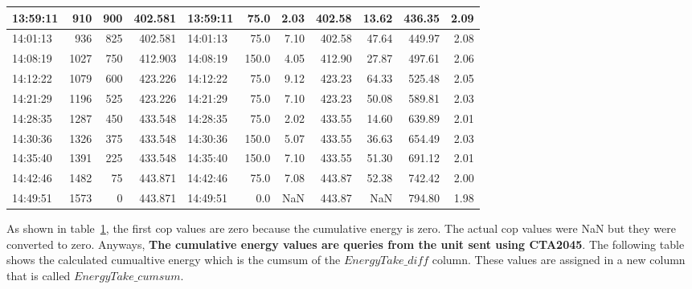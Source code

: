 \begin{table}[ht!]
\begin{adjustbox}{max width=\textwidth}
\begin{tabular}{|l|r|r|r|l|r|r|r|r|r|r|}
13:59:11 &                910 &                900 &         402.581 & 13:59:11 &             75.0 &       2.03 &         402.58 &  13.62 &     436.35 & 2.09 \\ \hline
14:01:13 &                936 &                825 &         402.581 & 14:01:13 &             75.0 &       7.10 &         402.58 &  47.64 &     449.97 & 2.08 \\ \hline
14:08:19 &               1027 &                750 &         412.903 & 14:08:19 &            150.0 &       4.05 &         412.90 &  27.87 &     497.61 & 2.06 \\ \hline
14:12:22 &               1079 &                600 &         423.226 & 14:12:22 &             75.0 &       9.12 &         423.23 &  64.33 &     525.48 & 2.05 \\ \hline
14:21:29 &               1196 &                525 &         423.226 & 14:21:29 &             75.0 &       7.10 &         423.23 &  50.08 &     589.81 & 2.03 \\ \hline
14:28:35 &               1287 &                450 &         433.548 & 14:28:35 &             75.0 &       2.02 &         433.55 &  14.60 &     639.89 & 2.01 \\ \hline
14:30:36 &               1326 &                375 &         433.548 & 14:30:36 &            150.0 &       5.07 &         433.55 &  36.63 &     654.49 & 2.03 \\ \hline
14:35:40 &               1391 &                225 &         433.548 & 14:35:40 &            150.0 &       7.10 &         433.55 &  51.30 &     691.12 & 2.01 \\ \hline
14:42:46 &               1482 &                 75 &         443.871 & 14:42:46 &             75.0 &       7.08 &         443.87 &  52.38 &     742.42 & 2.00 \\ \hline
14:49:51 &               1573 &                  0 &         443.871 & 14:49:51 &              0.0 &        NaN &         443.87 &    NaN &     794.80 & 1.98 \\ \hline

\end{tabular}
\label{table:cta-energytake}
\end{adjustbox}
\end{table}
\par As shown in table~\ref{table:cta-energytake}, the first cop values are zero because the cumulative energy is zero. The actual cop values
were NaN but they were converted to zero. Anyways, \textbf{The cumulative energy values are queries from the unit sent
using CTA2045}. The following table shows the calculated cumualtive energy which is the cumsum of the $EnergyTake\_diff$
column. These values are assigned in a new column that is called $EnergyTake\_cumsum$.


